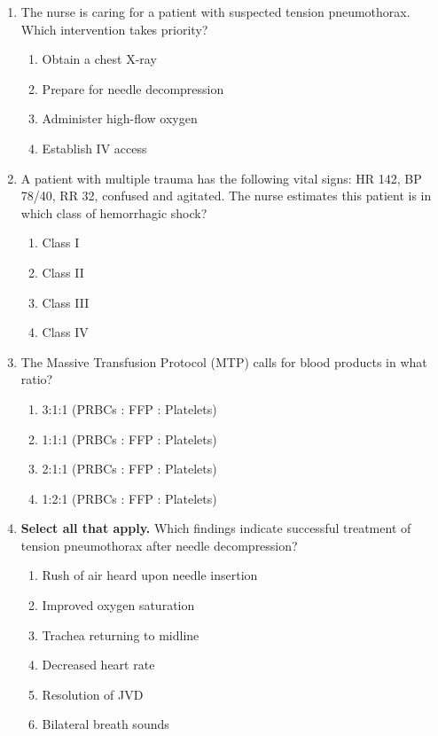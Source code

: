 \documentclass[11pt]{article}
\begin{document}
\begin{enumerate}
\item The nurse is caring for a patient with suspected tension pneumothorax. Which intervention takes priority?

\begin{enumerate}[label=\Alph*.]
    \item Obtain a chest X-ray
    \item Prepare for needle decompression
    \item Administer high-flow oxygen
    \item Establish IV access
\end{enumerate}

\item A patient with multiple trauma has the following vital signs: HR 142, BP 78/40, RR 32, confused and agitated. The nurse estimates this patient is in which class of hemorrhagic shock?

\begin{enumerate}[label=\Alph*.]
    \item Class I
    \item Class II
    \item Class III
    \item Class IV
\end{enumerate}

\item The Massive Transfusion Protocol (MTP) calls for blood products in what ratio?

\begin{enumerate}[label=\Alph*.]
    \item 3:1:1 (PRBCs : FFP : Platelets)
    \item 1:1:1 (PRBCs : FFP : Platelets)
    \item 2:1:1 (PRBCs : FFP : Platelets)
    \item 1:2:1 (PRBCs : FFP : Platelets)
\end{enumerate}

\item \textbf{Select all that apply.} Which findings indicate successful treatment of tension pneumothorax after needle decompression?

\begin{enumerate}[label=\Alph*.]
    \item Rush of air heard upon needle insertion
    \item Improved oxygen saturation
    \item Trachea returning to midline
    \item Decreased heart rate
    \item Resolution of JVD
    \item Bilateral breath sounds
\end{enumerate}


\end{enumerate}
\end{document}
